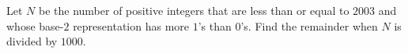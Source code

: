 Let $N$ be the number of positive integers that are less than or equal to $2003$ and whose base-$2$ representation has more $1$'s than $0$'s. Find the remainder when $N$ is divided by $1000$.
